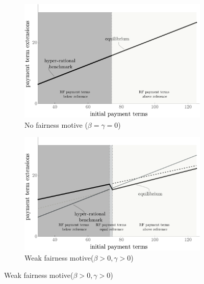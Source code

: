 \documentclass[a4paper,11pt]{article}
\renewcommand{\~}[1]{\tilde{#1}}
\renewcommand{\-}[1]{\overline{#1}}
\begin{document}
\begin{figure}[htb]
      \begin{subfigure}[b]{0.48\textwidth}
         \centering
         \includegraphics[width=\textwidth]{figures/06_ExtensionFairness_0.pdf}
         \caption{No fairness motive \newline ($\beta=\gamma=0$) \vspace{12pt}}
         \label{fig:delta:rational:full}
     \end{subfigure}\hfill
     \begin{subfigure}[b]{0.48\textwidth}
         \centering
         \includegraphics[width=\textwidth]{figures/06_ExtensionFairness_2.pdf}
         \caption{Weak fairness motive\newline ($\beta>0, \gamma>0$) \vspace{12pt}}
         \label{fig:delta:rational:dominant}
     \end{subfigure}
     \newline

\end{figure}
\end{document}
